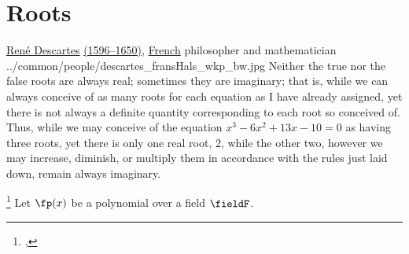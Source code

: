 \section{Roots}
\qboxnpq
  {\href{http://en.wikipedia.org/wiki/Descartes}{Ren\'e Descartes}
   \href{http://www-history.mcs.st-andrews.ac.uk/Timelines/TimelineC.html}{(1596--1650)},
   \href{http://www-history.mcs.st-andrews.ac.uk/BirthplaceMaps/Places/France.html}{French}
   philosopher and mathematician\footnotemark
  }
  {../common/people/descartes_fransHals_wkp_bw.jpg}
  {Neither the true nor the false roots are always real;
   sometimes they are imaginary;
   that is, while we can always conceive of as many roots for each equation
   as I have already assigned,
   yet there is not always a definite quantity corresponding to each root so conceived of.
   Thus, while we may conceive of the equation
   $x^3-6x^2+13x-10=0$ as having three roots,
   yet there is only one real root, 2, while the other two,
   however we may increase, diminish, or multiply them in accordance with the rules just laid down,
   remain always imaginary.}


\begin{theorem}
\footnote{
  ,
  }
Let $\fp(x)$ be a polynomial over a field $\fieldF$.
\end{theorem}

